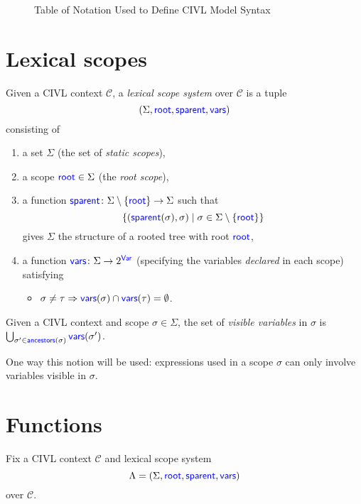 \begin{figure}
  \notationtable
  \caption{Table of Notation Used to Define CIVL Model Syntax}
  \label{fig:notation}
\end{figure}

\section{Lexical scopes}
\label{sec:scopes}

\begin{definition}
  Given a CIVL context $\mathcal{C}$, a \emph{lexical scope system}
  over $\mathcal{C}$ is a tuple 
  \[
  (\Sigma,\textup{\textsf{\textcolor{blue}{root}}},\textup{\textsf{\textcolor{blue}{sparent}}},\textup{\textsf{\textcolor{blue}{vars}}})
  \]
  consisting of
  \begin{enumerate}
  \item a set $\Sigma$ (the set of \emph{static scopes}),
  \item a scope $\textup{\textsf{\textcolor{blue}{root}}}\in\Sigma$ (the  \emph{root scope}),
  \item a function
    $\textup{\textsf{\textcolor{blue}{sparent}}}\colon\Sigma\setminus\{\textup{\textsf{\textcolor{blue}{root}}}\}\rightarrow
    \Sigma$ such that 
    \[\{(\textup{\textsf{\textcolor{blue}{sparent}}}(\sigma),\sigma)\mid \sigma\in\Sigma\setminus\{\textup{\textsf{\textcolor{blue}{root}}}\}\}\]
    gives $\Sigma$ the structure of a rooted tree with root $\textup{\textsf{\textcolor{blue}{root}}}$,
  \item a function $\textup{\textsf{\textcolor{blue}{vars}}}\colon\Sigma\rightarrow 2^{\textup{\textsf{\textcolor{blue}{Var}}}}$ 
    (specifying the variables \emph{declared} in each scope) satisfying
    \begin{itemize}
    \item $\sigma\neq\tau\Rightarrow \textup{\textsf{\textcolor{blue}{vars}}}(\sigma)\cap \textup{\textsf{\textcolor{blue}{vars}}}(\tau)=\emptyset$.
    \end{itemize}
  \end{enumerate}
\end{definition}

\begin{definition}
  Given a CIVL context and scope $\sigma\in\Sigma$,
  the set of \emph{visible variables} in $\sigma$
  is $\bigcup_{\sigma'\in\textup{\textsf{\textcolor{blue}{ancestors}}}(\sigma)}\textup{\textsf{\textcolor{blue}{vars}}}(\sigma')$.
\end{definition}

One way this notion will be used: expressions used in a scope $\sigma$
can only involve variables visible in $\sigma$.

\section{Functions}
\label{sec:functions}

Fix a CIVL context $\mathcal{C}$ and lexical scope system
\[\Lambda=(\Sigma,\textup{\textsf{\textcolor{blue}{root}}},\textup{\textsf{\textcolor{blue}{sparent}}},\textup{\textsf{\textcolor{blue}{vars}}})\] over $\mathcal{C}$.

